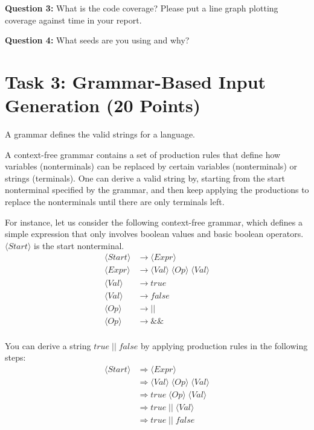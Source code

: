 \documentclass[letterpaper,11pt]{article}
\begin{document}
\textbf{Question 3:}
What is the code coverage? Please put a line graph plotting coverage against time in your report.

\textbf{Question 4:}
What seeds are you using and why?


\section{Task 3: Grammar-Based Input Generation (20 Points)}
\label{sec:grammar}

A grammar defines the valid strings for a language.

A context-free grammar contains a set of production rules that define how variables (nonterminals) can be replaced by certain variables (nonterminals) or strings (terminals).
One can derive a valid string by, starting from the start nonterminal specified by the grammar, and then keep applying the productions to replace the nonterminals until there are only terminals left.

For instance, let us consider the following context-free grammar, which defines a simple expression that only involves boolean values and basic boolean operators.
$\langle Start \rangle$ is the start nonterminal.
\begin{align*}
    \langle Start \rangle  &\rightarrow  \langle Expr \rangle \\
    \langle Expr \rangle &\rightarrow \langle Val \rangle \; \langle Op \rangle \; \langle Val \rangle  \\
    \langle Val \rangle  &\rightarrow  true \\
    \langle Val \rangle  &\rightarrow  false \\
    \langle Op \rangle  &\rightarrow  || \\
    \langle Op \rangle  &\rightarrow  \& \& \\
\end{align*}

You can derive a string $true \; || \; false$ by applying production rules in the following steps:
\begin{align*}
     \langle Start \rangle &\Rightarrow \langle Expr \rangle \\
     &\Rightarrow \langle Val \rangle \; \langle Op \rangle \; \langle Val \rangle \\
     &\Rightarrow true \; \langle Op \rangle \; \langle Val \rangle \\
     &\Rightarrow true \; || \; \langle Val \rangle \\
     &\Rightarrow true \; || \; false \\
\end{align*}
\end{document}
